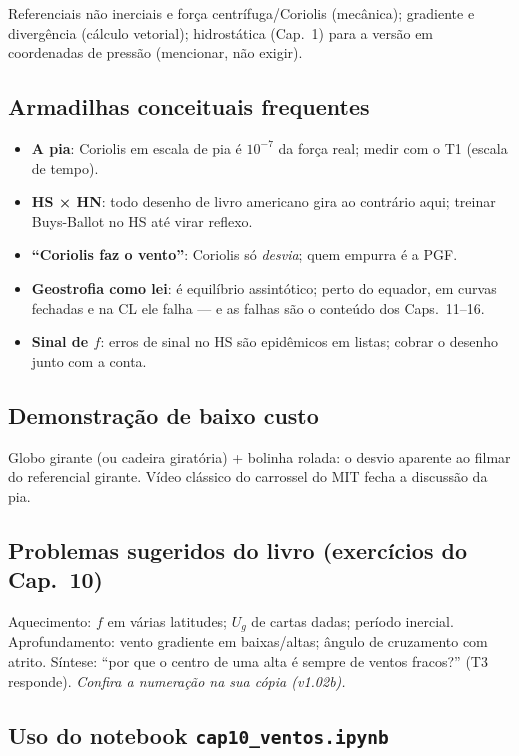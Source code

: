 Referenciais não inerciais e força centrífuga/Coriolis (mecânica);
gradiente e divergência (cálculo vetorial); hidrostática (Cap.~1) para a
versão em coordenadas de pressão (mencionar, não exigir).

\subsection*{Armadilhas conceituais frequentes}

\begin{itemize}
  \item \textbf{A pia}: Coriolis em escala de pia é $10^{-7}$ da força
        real; medir com o T1 (escala de tempo).
  \item \textbf{HS × HN}: todo desenho de livro americano gira ao
        contrário aqui; treinar Buys-Ballot no HS até virar reflexo.
  \item \textbf{``Coriolis faz o vento''}: Coriolis só \emph{desvia}; quem
        empurra é a PGF.
  \item \textbf{Geostrofia como lei}: é equilíbrio assintótico; perto do
        equador, em curvas fechadas e na CL ele falha — e as falhas são o
        conteúdo dos Caps.~11--16.
  \item \textbf{Sinal de $f$}: erros de sinal no HS são epidêmicos em
        listas; cobrar o desenho junto com a conta.
\end{itemize}

\subsection*{Demonstração de baixo custo}

Globo girante (ou cadeira giratória) + bolinha rolada: o desvio aparente
ao filmar do referencial girante. Vídeo clássico do carrossel do MIT
fecha a discussão da pia.

\subsection*{Problemas sugeridos do livro (exercícios do Cap.~10)}

Aquecimento: $f$ em várias latitudes; $U_g$ de cartas dadas; período
inercial. Aprofundamento: vento gradiente em baixas/altas; ângulo de
cruzamento com atrito. Síntese: ``por que o centro de uma alta é sempre de
ventos fracos?'' (T3 responde).
\emph{Confira a numeração na sua cópia (v1.02b).}

\subsection*{Uso do notebook \texttt{cap10\_ventos.ipynb}}

